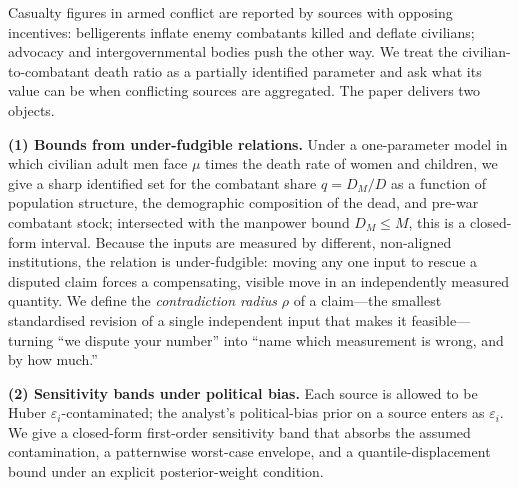 \noindent
Casualty figures in armed conflict are reported by sources with opposing incentives: belligerents inflate enemy combatants killed and deflate civilians; advocacy and intergovernmental bodies push the other way. We treat the civilian-to-combatant death ratio as a partially identified parameter and ask what its value can be when conflicting sources are aggregated. The paper delivers two objects.

\textbf{(1) Bounds from under-fudgible relations.} Under a one-parameter model in which civilian adult men face $\mu$ times the death rate of women and children, we give a sharp identified set for the combatant share $q=D_M/D$ as a function of population structure, the demographic composition of the dead, and pre-war combatant stock; intersected with the manpower bound $D_M\le M$, this is a closed-form interval. Because the inputs are measured by different, non-aligned institutions, the relation is under-fudgible: moving any one input to rescue a disputed claim forces a compensating, visible move in an independently measured quantity. We define the \emph{contradiction radius} $\rho$ of a claim---the smallest standardised revision of a single independent input that makes it feasible---turning ``we dispute your number'' into ``name which measurement is wrong, and by how much.''

\textbf{(2) Sensitivity bands under political bias.} Each source is allowed to be Huber $\varepsilon_i$-contaminated; the analyst's political-bias prior on a source enters as $\varepsilon_i$. We give a closed-form first-order sensitivity band that absorbs the assumed contamination, a patternwise worst-case envelope, and a quantile-displacement bound under an explicit posterior-weight condition.


